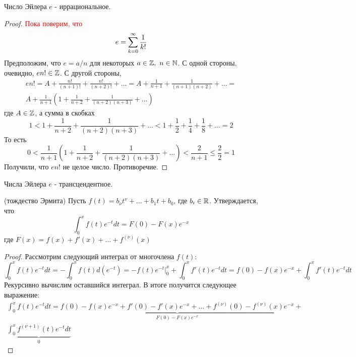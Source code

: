 \begin{theorem}
	Число Эйлера $e$ - иррациональное.
\end{theorem}

\begin{proof}
	\textcolor{red}{Пока поверим, что}
	\[
		e = \sum\limits_{k = 0}^\infty \frac{1}{k!}
	\]
	Предположим, что $e = a/n$ для некоторых $a \in \mathbb{Z},\ n \in \mathbb{N}$. С одной стороны, очевидно, $en! \in \mathbb{Z}$. С другой стороны,
	\begin{multline*}
		en! = A + \frac{n!}{(n + 1)!} + \frac{n!}{(n + 2)!} + \ldots = A + \frac{1}{n + 1} + \frac{1}{(n + 1)(n + 2)} + \ldots =
		\\
		A + \frac{1}{n + 1} \left(1 + \frac{1}{n + 2} + \frac{1}{(n + 2)(n + 3)} + \ldots\right)
	\end{multline*}
	где $A \in \mathbb{Z}$, а сумма в скобках
	\[
		1 < 1 + \frac{1}{n + 2} + \frac{1}{(n + 2)(n + 3)} + \ldots < 1 + \frac{1}{2} + \frac{1}{4} + \frac{1}{8} + \ldots = 2
	\]
	То есть
	\[
		0 < \frac{1}{n + 1} \left(1 + \frac{1}{n + 2} + \frac{1}{(n + 2)(n + 3)} + \ldots\right) < \frac{2}{n + 1} \le \frac{2}{2} = 1
	\]
	Получили, что $en!$ не целое число. Противоречие.
\end{proof}

\begin{theorem}
	Числа Эйлера $e$ - трансцендентное.
\end{theorem}

\begin{lemma} (тождество Эрмита)
	Пусть $f(t) = b_{\nu}t^{\nu} + \ldots + b_1 t + b_0$, где $b_i \in \mathbb{R}$. Утверждается, что
	\[
		\int_0^x f(t) e^{-t} dt = F(0) - F(x)e^{-x}
	\]
	где $F(x) = f(x) + f'(x) + \ldots + f^{(\nu)}(x)$
\end{lemma}

\begin{proof}
	Рассмотрим следующий интеграл от многочлена $f(t)$:
	\[
		\int_0^x f(t) e^{-t} dt = -\int_0^x f(t) d(e^{-t}) = -f(t) e^{-t} |_0^x + \int_0^x f'(t) e^{-t} dt = f(0) - f(x)e^{-x} + \int_0^x f'(t)e^{-t} dt
	\]
	Рекурсивно вычислим оставшийся интеграл. В итоге получится следующее выражение:
	\begin{multline*}
		\int_0^x f(t) e^{-t} dt = \underbrace{f(0) - f(x)e^{-x} + f'(0) - f'(x)e^{-x} + \ldots + f^{(\nu)}(0) - f^{(\nu)}(x)e^{-x}}_{F(0) - F(x)e^{-x}} +
		\\
		\underbrace{\int_0^x f^{(\nu + 1)}(t) e^{-t} dt}_{0}
	\end{multline*}
\end{proof}

